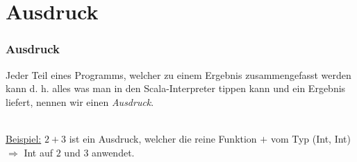	\section[Section]{Ausdruck}
		\begin{frame}
			\frametitle{Ausdruck}
			\begin{definition}[Ausdurck]
				Jeder Teil eines Programms, welcher zu einem Ergebnis 								zusammengefasst werden kann d. h. alles was man in den 
				Scala-Interpreter tippen kann und ein Ergebnis liefert,
				nennen wir einen \emph{Ausdruck}.
		\end{definition} 
		\leavevmode \\
		\underline{Beispiel:} $2+3$ ist ein Ausdruck, welcher die reine Funktion
		$+$  vom Typ (Int, Int) $\Rightarrow$ Int auf $2$ und $3$ anwendet.
		\end{frame}